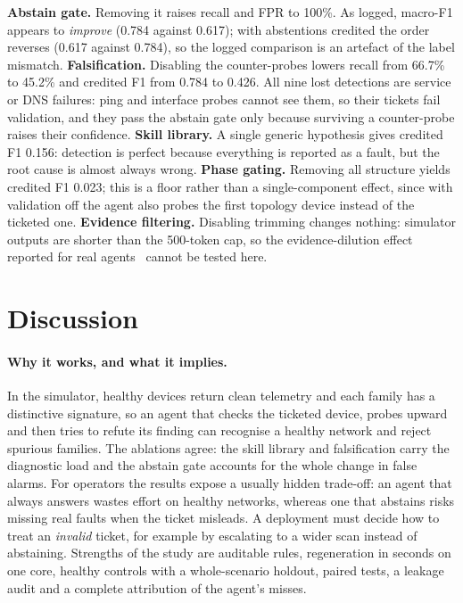 \documentclass[pdflatex,sn-basic,Numbered,iicol]{sn-jnl}
\begin{document}
\textbf{Abstain gate.} Removing it raises recall and FPR to 100\%. As logged, macro-F1 appears to \emph{improve} (0.784 against 0.617); with abstentions credited the order reverses (0.617 against 0.784), so the logged comparison is an artefact of the label mismatch. \textbf{Falsification.} Disabling the counter-probes lowers recall from 66.7\% to 45.2\% and credited F1 from 0.784 to 0.426. All nine lost detections are service or DNS failures: ping and interface probes cannot see them, so their tickets fail validation, and they pass the abstain gate only because surviving a counter-probe raises their confidence. \textbf{Skill library.} A single generic hypothesis gives credited F1 0.156: detection is perfect because everything is reported as a fault, but the root cause is almost always wrong. \textbf{Phase gating.} Removing all structure yields credited F1 0.023; this is a floor rather than a single-component effect, since with validation off the agent also probes the first topology device instead of the ticketed one. \textbf{Evidence filtering.} Disabling trimming changes nothing: simulator outputs are shorter than the 500-token cap, so the evidence-dilution effect reported for real agents~\cite{zhang2026rclagent} cannot be tested here.

\section{Discussion}\label{sec:discussion}

\paragraph{Why it works, and what it implies.} In the simulator, healthy devices return clean telemetry and each family has a distinctive signature, so an agent that checks the ticketed device, probes upward and then tries to refute its finding can recognise a healthy network and reject spurious families. The ablations agree: the skill library and falsification carry the diagnostic load and the abstain gate accounts for the whole change in false alarms. For operators the results expose a usually hidden trade-off: an agent that always answers wastes effort on healthy networks, whereas one that abstains risks missing real faults when the ticket misleads. A deployment must decide how to treat an \emph{invalid} ticket, for example by escalating to a wider scan instead of abstaining. Strengths of the study are auditable rules, regeneration in seconds on one core, healthy controls with a whole-scenario holdout, paired tests, a leakage audit and a complete attribution of the agent's misses.
\end{document}
